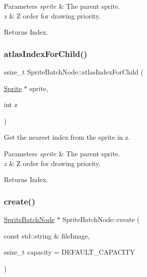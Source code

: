 \begin{DoxyParams}{Parameters}
{\em sprite} & The parent sprite. \\
\hline
{\em z} & Z order for drawing priority. \\
\hline
\end{DoxyParams}
\begin{DoxyReturn}{Returns}
Index. 
\end{DoxyReturn}
\mbox{\label{classSpriteBatchNode_a86c50a80880095b311ba60fa04c4152f}} 
\subsubsection{\texorpdfstring{atlas\+Index\+For\+Child()}{atlasIndexForChild()}\hspace{0.1cm}{\footnotesize\ttfamily [2/2]}}
{\footnotesize\ttfamily ssize\+\_\+t Sprite\+Batch\+Node\+::atlas\+Index\+For\+Child (\begin{DoxyParamCaption}\item[{\hyperlink{classSprite}{Sprite} $\ast$}]{sprite,  }\item[{int}]{z }\end{DoxyParamCaption})}

Get the nearest index from the sprite in z.


\begin{DoxyParams}{Parameters}
{\em sprite} & The parent sprite. \\
\hline
{\em z} & Z order for drawing priority. \\
\hline
\end{DoxyParams}
\begin{DoxyReturn}{Returns}
Index. 
\end{DoxyReturn}
\mbox{\label{classSpriteBatchNode_a470e1bd31aee44de0c6b09592442c77b}} 
\subsubsection{\texorpdfstring{create()}{create()}\hspace{0.1cm}{\footnotesize\ttfamily [1/2]}}
{\footnotesize\ttfamily \hyperlink{classSpriteBatchNode}{Sprite\+Batch\+Node} $\ast$ Sprite\+Batch\+Node\+::create (\begin{DoxyParamCaption}\item[{const std\+::string \&}]{file\+Image,  }\item[{ssize\+\_\+t}]{capacity = {\ttfamily DEFAULT\+\_\+CAPACITY} }\end{DoxyParamCaption})\hspace{0.3cm}{\ttfamily [static]}}

